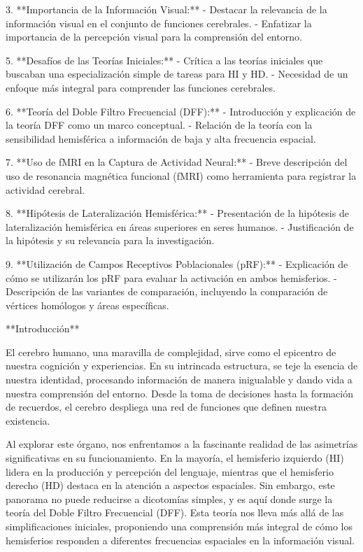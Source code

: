 \documentclass[12pt,oneside]{uhthesis}
\begin{document}
3. **Importancia de la Información Visual:**
- Destacar la relevancia de la información visual en el conjunto de funciones cerebrales.
- Enfatizar la importancia de la percepción visual para la comprensión del entorno.

5. **Desafíos de las Teorías Iniciales:**
- Crítica a las teorías iniciales que buscaban una especialización simple de tareas para HI y HD.
- Necesidad de un enfoque más integral para comprender las funciones cerebrales.

6. **Teoría del Doble Filtro Frecuencial (DFF):**
- Introducción y explicación de la teoría DFF como un marco conceptual.
- Relación de la teoría con la sensibilidad hemisférica a información de baja y alta frecuencia espacial.

7. **Uso de fMRI en la Captura de Actividad Neural:**
- Breve descripción del uso de resonancia magnética funcional (fMRI) como herramienta para registrar la actividad cerebral.

8. **Hipótesis de Lateralización Hemisférica:**
- Presentación de la hipótesis de lateralización hemisférica en áreas superiores en seres humanos.
- Justificación de la hipótesis y su relevancia para la investigación.

9. **Utilización de Campos Receptivos Poblacionales (pRF):**
- Explicación de cómo se utilizarán los pRF para evaluar la activación en ambos hemisferios.
- Descripción de las variantes de comparación, incluyendo la comparación de vértices homólogos y áreas específicas.

\newpage

**Introducción**

El cerebro humano, una maravilla de complejidad, sirve como el epicentro de nuestra cognición y experiencias. En su intrincada estructura, se teje la esencia de nuestra identidad, procesando información de manera inigualable y dando vida a nuestra comprensión del entorno. Desde la toma de decisiones hasta la formación de recuerdos, el cerebro despliega una red de funciones que definen nuestra existencia.

Al explorar este órgano, nos enfrentamos a la fascinante realidad de las asimetrías significativas en su funcionamiento. En la mayoría, el hemisferio izquierdo (HI) lidera en la producción y percepción del lenguaje, mientras que el hemisferio derecho (HD) destaca en la atención a aspectos espaciales. Sin embargo, este panorama no puede reducirse a dicotomías simples, y es aquí donde surge la teoría del Doble Filtro Frecuencial (DFF). Esta teoría nos lleva más allá de las simplificaciones iniciales, proponiendo una comprensión más integral de cómo los hemisferios responden a diferentes frecuencias espaciales en la información visual.
\end{document}

